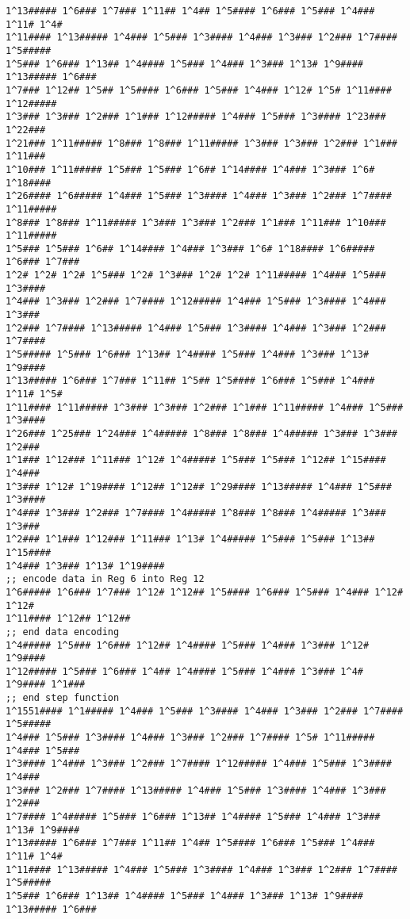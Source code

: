 \begin{@twocolumnfalse}
\begin{lstlisting}
1^13##### 1^6### 1^7### 1^11## 1^4## 1^5#### 1^6### 1^5### 1^4### 1^11# 1^4#
1^11#### 1^13##### 1^4### 1^5### 1^3#### 1^4### 1^3### 1^2### 1^7#### 1^5#####
1^5### 1^6### 1^13## 1^4#### 1^5### 1^4### 1^3### 1^13# 1^9#### 1^13##### 1^6###
1^7### 1^12## 1^5## 1^5#### 1^6### 1^5### 1^4### 1^12# 1^5# 1^11#### 1^12#####
1^3### 1^3### 1^2### 1^1### 1^12##### 1^4### 1^5### 1^3#### 1^23### 1^22###
1^21### 1^11##### 1^8### 1^8### 1^11##### 1^3### 1^3### 1^2### 1^1### 1^11###
1^10### 1^11##### 1^5### 1^5### 1^6## 1^14#### 1^4### 1^3### 1^6# 1^18####
1^26#### 1^6##### 1^4### 1^5### 1^3#### 1^4### 1^3### 1^2### 1^7#### 1^11#####
1^8### 1^8### 1^11##### 1^3### 1^3### 1^2### 1^1### 1^11### 1^10### 1^11#####
1^5### 1^5### 1^6## 1^14#### 1^4### 1^3### 1^6# 1^18#### 1^6##### 1^6### 1^7###
1^2# 1^2# 1^2# 1^5### 1^2# 1^3### 1^2# 1^2# 1^11##### 1^4### 1^5### 1^3####
1^4### 1^3### 1^2### 1^7#### 1^12##### 1^4### 1^5### 1^3#### 1^4### 1^3###
1^2### 1^7#### 1^13##### 1^4### 1^5### 1^3#### 1^4### 1^3### 1^2### 1^7####
1^5##### 1^5### 1^6### 1^13## 1^4#### 1^5### 1^4### 1^3### 1^13# 1^9####
1^13##### 1^6### 1^7### 1^11## 1^5## 1^5#### 1^6### 1^5### 1^4### 1^11# 1^5#
1^11#### 1^11##### 1^3### 1^3### 1^2### 1^1### 1^11##### 1^4### 1^5### 1^3####
1^26### 1^25### 1^24### 1^4##### 1^8### 1^8### 1^4##### 1^3### 1^3### 1^2###
1^1### 1^12### 1^11### 1^12# 1^4##### 1^5### 1^5### 1^12## 1^15#### 1^4###
1^3### 1^12# 1^19#### 1^12## 1^12## 1^29#### 1^13##### 1^4### 1^5### 1^3####
1^4### 1^3### 1^2### 1^7#### 1^4##### 1^8### 1^8### 1^4##### 1^3### 1^3###
1^2### 1^1### 1^12### 1^11### 1^13# 1^4##### 1^5### 1^5### 1^13## 1^15####
1^4### 1^3### 1^13# 1^19####
;; encode data in Reg 6 into Reg 12
1^6##### 1^6### 1^7### 1^12# 1^12## 1^5#### 1^6### 1^5### 1^4### 1^12# 1^12#
1^11#### 1^12## 1^12##
;; end data encoding
1^4##### 1^5### 1^6### 1^12## 1^4#### 1^5### 1^4### 1^3### 1^12# 1^9####
1^12##### 1^5### 1^6### 1^4## 1^4#### 1^5### 1^4### 1^3### 1^4# 1^9#### 1^1###
;; end step function
1^1551#### 1^1##### 1^4### 1^5### 1^3#### 1^4### 1^3### 1^2### 1^7#### 1^5#####
1^4### 1^5### 1^3#### 1^4### 1^3### 1^2### 1^7#### 1^5# 1^11##### 1^4### 1^5###
1^3#### 1^4### 1^3### 1^2### 1^7#### 1^12##### 1^4### 1^5### 1^3#### 1^4###
1^3### 1^2### 1^7#### 1^13##### 1^4### 1^5### 1^3#### 1^4### 1^3### 1^2###
1^7#### 1^4##### 1^5### 1^6### 1^13## 1^4#### 1^5### 1^4### 1^3### 1^13# 1^9####
1^13##### 1^6### 1^7### 1^11## 1^4## 1^5#### 1^6### 1^5### 1^4### 1^11# 1^4#
1^11#### 1^13##### 1^4### 1^5### 1^3#### 1^4### 1^3### 1^2### 1^7#### 1^5#####
1^5### 1^6### 1^13## 1^4#### 1^5### 1^4### 1^3### 1^13# 1^9#### 1^13##### 1^6###

\end{lstlisting}
\end{@twocolumnfalse}
